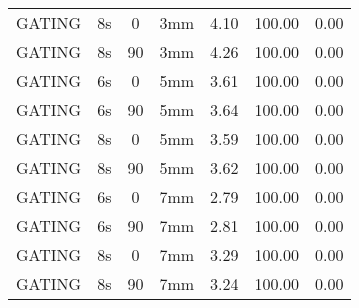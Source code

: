 \begin{table}[H]
\begin{tabular}{|c||c|c|c||c|c|c|}
GATING & 8s & 0 & 3mm & 4.10 & 100.00 & 0.00 \\
GATING & 8s & 90 & 3mm & 4.26 & 100.00 & 0.00 \\
GATING & 6s & 0 & 5mm & 3.61 & 100.00 & 0.00 \\
GATING & 6s & 90 & 5mm & 3.64 & 100.00 & 0.00 \\
GATING & 8s & 0 & 5mm & 3.59 & 100.00 & 0.00 \\
GATING & 8s & 90 & 5mm & 3.62 & 100.00 & 0.00 \\
GATING & 6s & 0 & 7mm & 2.79 & 100.00 & 0.00 \\
GATING & 6s & 90 & 7mm & 2.81 & 100.00 & 0.00 \\
GATING & 8s & 0 & 7mm & 3.29 & 100.00 & 0.00 \\
GATING & 8s & 90 & 7mm & 3.24 & 100.00 & 0.00 \\
    \hline\hline 
  \end{tabular}
\end{table}


\newpage

